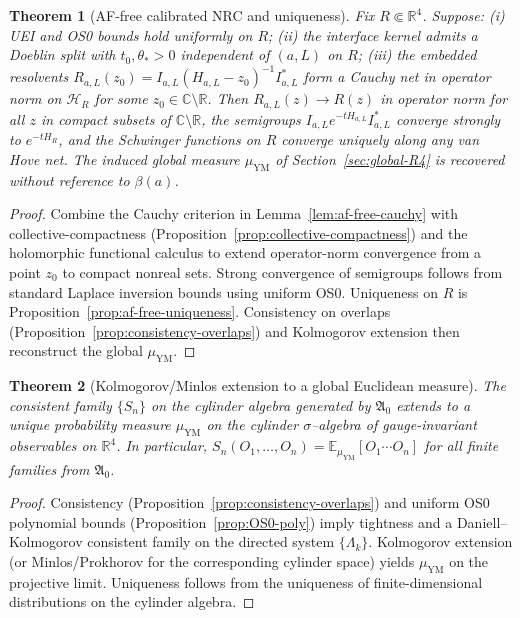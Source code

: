 \documentclass[11pt]{amsart}
\theoremstyle{plain}
\newtheorem{theorem}{Theorem}[section]
\theoremstyle{definition}
\theoremstyle{remark}
\begin{document}
\begin{theorem}[AF-free calibrated NRC and uniqueness]\label{thm:af-free-calibrated}
Fix $R\Subset\mathbb R^4$. Suppose: (i) UEI and OS0 bounds hold uniformly on $R$; (ii) the interface kernel admits a Doeblin split with $t_0,\theta_*>0$ independent of $(a,L)$ on $R$; (iii) the embedded resolvents $R_{a,L}(z_0)=I_{a,L}(H_{a,L}-z_0)^{-1}I_{a,L}^*$ form a Cauchy net in operator norm on $\mathcal H_R$ for some $z_0\in\mathbb C\setminus\mathbb R$. Then $R_{a,L}(z)\to R(z)$ in operator norm for all $z$ in compact subsets of $\mathbb C\setminus\mathbb R$, the semigroups $I_{a,L}e^{-tH_{a,L}}I_{a,L}^*$ converge strongly to $e^{-tH_R}$, and the Schwinger functions on $R$ converge uniquely along any van Hove net. The induced global measure $\mu_{\mathrm{YM}}$ of Section~\ref{sec:global-R4} is recovered without reference to $\beta(a)$.
\end{theorem}
\begin{proof}
Combine the Cauchy criterion in Lemma~\ref{lem:af-free-cauchy} with collective-compactness (Proposition~\ref{prop:collective-compactness}) and the holomorphic functional calculus to extend operator-norm convergence from a point $z_0$ to compact nonreal sets. Strong convergence of semigroups follows from standard Laplace inversion bounds using uniform OS0. Uniqueness on $R$ is Proposition~\ref{prop:af-free-uniqueness}. Consistency on overlaps (Proposition~\ref{prop:consistency-overlaps}) and Kolmogorov extension then reconstruct the global $\mu_{\mathrm{YM}}$.
\end{proof}

\begin{theorem}[Kolmogorov/Minlos extension to a global Euclidean measure]\label{thm:kolmogorov-global}
The consistent family $\{S_n\}$ on the cylinder algebra generated by $\mathfrak A_0$ extends to a unique probability measure $\mu_{\mathrm{YM}}$ on the cylinder $\sigma$--algebra of gauge-invariant observables on $\mathbb R^4$. In particular, $S_n(O_1,\dots,O_n)=\mathbb E_{\mu_{\mathrm{YM}}}[O_1\cdots O_n]$ for all finite families from $\mathfrak A_0$.
\end{theorem}
\begin{proof}
Consistency (Proposition~\ref{prop:consistency-overlaps}) and uniform OS0 polynomial bounds (Proposition~\ref{prop:OS0-poly}) imply tightness and a Daniell--Kolmogorov consistent family on the directed system $\{\Lambda_k\}$. Kolmogorov extension (or Minlos/Prokhorov for the corresponding cylinder space) yields $\mu_{\mathrm{YM}}$ on the projective limit. Uniqueness follows from the uniqueness of finite-dimensional distributions on the cylinder algebra.
\end{proof}
\end{document}
